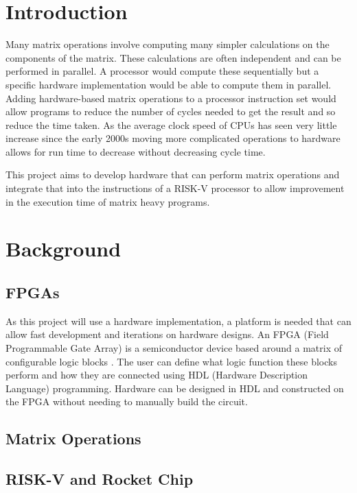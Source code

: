 \documentclass[a4paper,fleqn,12pt]{article}
\begin{document}
	
	
	
	\pagestyle{plain}
	
	\section{Introduction}
	Many matrix operations involve computing many simpler calculations on the components of the matrix. These calculations are often independent and can be performed in parallel. A processor would compute these sequentially but a specific hardware implementation would be able to compute them in parallel. Adding hardware-based matrix operations to a processor instruction set would allow programs to reduce the number of cycles needed to get the result and so reduce the time taken. As the average clock speed of CPUs has seen very little increase since the early 2000s moving more complicated operations to hardware allows for run time to decrease without decreasing cycle time.
	
	This project aims to develop hardware that can perform matrix operations and integrate that into the instructions of a RISK-V processor to allow improvement in the execution time of matrix heavy programs.
	
	\section{Background}
	\subsection{FPGAs}
	As this project will use a hardware implementation, a platform is needed that can allow fast development and iterations on hardware designs. An FPGA (Field Programmable Gate Array) is a semiconductor device based around a matrix of configurable logic blocks \citep{whatisanfpga}. The user can define what logic function these blocks perform and how they are connected using HDL (Hardware Description Language) programming. Hardware can be designed in HDL and constructed on the FPGA without needing to manually build the circuit.
	
	\subsection{Matrix Operations}
	
	\subsection{RISK-V and Rocket Chip}
	
\end{document}
